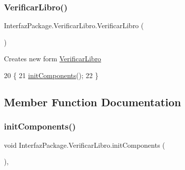 \subsubsection{\texorpdfstring{Verificar\+Libro()}{VerificarLibro()}}
{\footnotesize\ttfamily Interfaz\+Package.\+Verificar\+Libro.\+Verificar\+Libro (\begin{DoxyParamCaption}{ }\end{DoxyParamCaption})\hspace{0.3cm}{\ttfamily [inline]}}

Creates new form \mbox{\hyperlink{class_interfaz_package_1_1_verificar_libro}{Verificar\+Libro}} 
\begin{DoxyCode}
20                             \{
21         \mbox{\hyperlink{class_interfaz_package_1_1_verificar_libro_a37b15a7249b7b66e739622d43a9198b9}{initComponents}}();
22     \}
\end{DoxyCode}


\subsection{Member Function Documentation}
\mbox{\label{class_interfaz_package_1_1_verificar_libro_a37b15a7249b7b66e739622d43a9198b9}} 
\subsubsection{\texorpdfstring{init\+Components()}{initComponents()}}
{\footnotesize\ttfamily void Interfaz\+Package.\+Verificar\+Libro.\+init\+Components (\begin{DoxyParamCaption}{ }\end{DoxyParamCaption})\hspace{0.3cm}{\ttfamily [inline]}, {\ttfamily [private]}}

